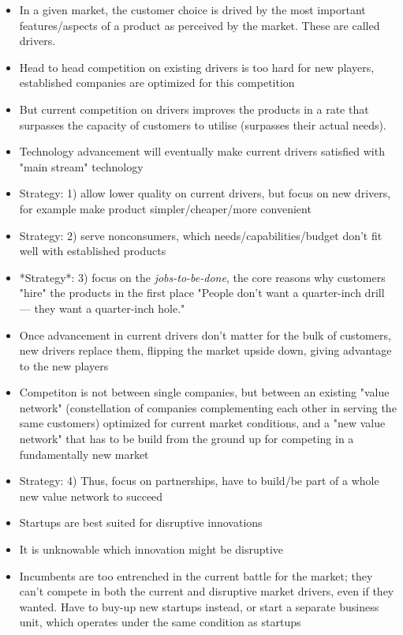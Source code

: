 \documentclass[a4paper,10pt]{article}
\begin{document}
\begin{itemize}
  \item In a given market, the customer choice is drived by the most important features/aspects of a product as perceived by the market. These are called drivers.
  \item Head to head competition on existing drivers is too hard for new players, established companies are optimized for this competition
  \item But current competition on drivers improves the products in a rate that surpasses the capacity of customers to utilise (surpasses their actual needs).
  \item Technology advancement will eventually make current drivers satisfied with "main stream" technology
  \item Strategy: 1) allow lower quality on current drivers, but focus on new drivers, for example make product simpler/cheaper/more convenient
  \item Strategy: 2) serve nonconsumers, which needs/capabilities/budget don't fit well with established products
  \item *Strategy*: 3) focus on the \emph{jobs-to-be-done}, the core reasons why customers "hire" the products in the first place
  \subitem "People don't want a quarter-inch drill — they want a quarter-inch hole."
  \item Once advancement in current drivers don't matter for the bulk of customers, new drivers replace them, flipping the market upside down, giving advantage to the new players
  \item Competiton is not between single companies, but between an existing "value network" (constellation of companies complementing each other in serving the same customers) 
	optimized for current market conditions, and a "new value network" that has to be build from the ground up for competing in a fundamentally new market
  \item Strategy: 4) Thus, focus on partnerships, have to build/be part of a whole new value network to succeed 
  \item Startups are best suited for disruptive innovations
  \item It is unknowable which innovation might be disruptive
  \item Incumbents are too entrenched in the current battle for the market; they can't compete in both the current and disruptive market drivers, even if they wanted. 
        Have to buy-up new startups instead, or start a separate business unit, which operates under the same condition as startups 
\end{itemize}
\end{document}
